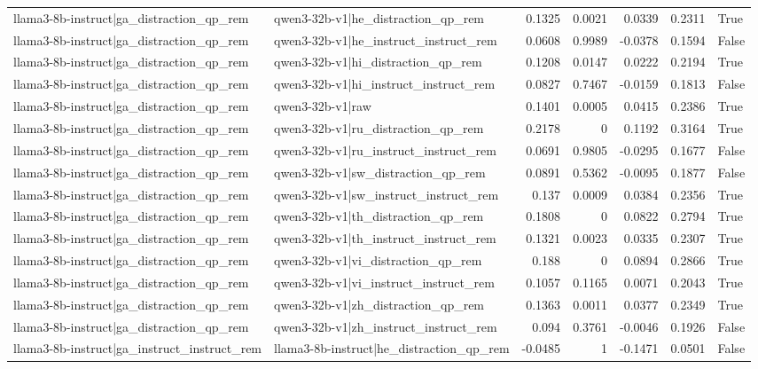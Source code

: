 \begin{table}
\begin{tabular}{l l r r r r l}
llama3-8b-instruct|ga_distraction_qp_rem & qwen3-32b-v1|he_distraction_qp_rem & 0.1325 & 0.0021 & 0.0339 & 0.2311 & True \\
llama3-8b-instruct|ga_distraction_qp_rem & qwen3-32b-v1|he_instruct_instruct_rem & 0.0608 & 0.9989 & -0.0378 & 0.1594 & False \\
llama3-8b-instruct|ga_distraction_qp_rem & qwen3-32b-v1|hi_distraction_qp_rem & 0.1208 & 0.0147 & 0.0222 & 0.2194 & True \\
llama3-8b-instruct|ga_distraction_qp_rem & qwen3-32b-v1|hi_instruct_instruct_rem & 0.0827 & 0.7467 & -0.0159 & 0.1813 & False \\
llama3-8b-instruct|ga_distraction_qp_rem & qwen3-32b-v1|raw & 0.1401 & 0.0005 & 0.0415 & 0.2386 & True \\
llama3-8b-instruct|ga_distraction_qp_rem & qwen3-32b-v1|ru_distraction_qp_rem & 0.2178 & 0 & 0.1192 & 0.3164 & True \\
llama3-8b-instruct|ga_distraction_qp_rem & qwen3-32b-v1|ru_instruct_instruct_rem & 0.0691 & 0.9805 & -0.0295 & 0.1677 & False \\
llama3-8b-instruct|ga_distraction_qp_rem & qwen3-32b-v1|sw_distraction_qp_rem & 0.0891 & 0.5362 & -0.0095 & 0.1877 & False \\
llama3-8b-instruct|ga_distraction_qp_rem & qwen3-32b-v1|sw_instruct_instruct_rem & 0.137 & 0.0009 & 0.0384 & 0.2356 & True \\
llama3-8b-instruct|ga_distraction_qp_rem & qwen3-32b-v1|th_distraction_qp_rem & 0.1808 & 0 & 0.0822 & 0.2794 & True \\
llama3-8b-instruct|ga_distraction_qp_rem & qwen3-32b-v1|th_instruct_instruct_rem & 0.1321 & 0.0023 & 0.0335 & 0.2307 & True \\
llama3-8b-instruct|ga_distraction_qp_rem & qwen3-32b-v1|vi_distraction_qp_rem & 0.188 & 0 & 0.0894 & 0.2866 & True \\
llama3-8b-instruct|ga_distraction_qp_rem & qwen3-32b-v1|vi_instruct_instruct_rem & 0.1057 & 0.1165 & 0.0071 & 0.2043 & True \\
llama3-8b-instruct|ga_distraction_qp_rem & qwen3-32b-v1|zh_distraction_qp_rem & 0.1363 & 0.0011 & 0.0377 & 0.2349 & True \\
llama3-8b-instruct|ga_distraction_qp_rem & qwen3-32b-v1|zh_instruct_instruct_rem & 0.094 & 0.3761 & -0.0046 & 0.1926 & False \\
llama3-8b-instruct|ga_instruct_instruct_rem & llama3-8b-instruct|he_distraction_qp_rem & -0.0485 & 1 & -0.1471 & 0.0501 & False \\

\end{tabular}
\end{table}
